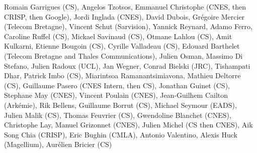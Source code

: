 Romain Garrigues (CS), Angelos Tzotsos, Emmanuel Christophe (CNES, then CRISP, then Google), Jordi Inglada (CNES), David Dubois, Gr\'egoire Mercier (Telecom Bretagne), Vincent Schut (Sarvision), Yannick Reynard, Adamo Ferro, Caroline Ruffel (CS), Mickael Savinaud (CS), Otmane Lahlou (CS), Amit Kulkarni, Etienne Bougoin (CS), Cyrille Valladeau (CS), Edouard Barthelet (Telecom Bretagne and Thales Communications), Julien Osman, Massimo Di Stefano, Julien Radoux (UCL), Jan Wegner, Conrad Bielski (JRC), Tishampati Dhar, Patrick Imbo (CS), Miarintsoa Ramanantsimiavona, Mathieu Deltorre (CS), Guillaume Pasero (CNES Intern, then CS), Jonathan Guinet (CS), Stephane May (CNES), Vincent Poulain (CNES), Jean-Guilhem Cailton (Ark\'emie), Rik Bellens, Guillaume Borrut (CS), Michael Seymour (EADS), Julien Malik (CS), Thomas Feuvrier (CS), Gwendoline Blanchet (CNES), Christophe Lay, Manuel Grizonnet (CNES), Julien Michel (CS then CNES), Aik Song Chia (CRISP), Eric Bughin (CMLA), Antonio Valentino, Alexis Huck (Magellium), Aur\'elien Bricier (CS)